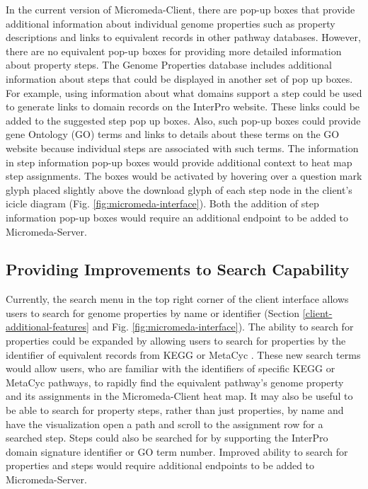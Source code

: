 In the current version of Micromeda-Client, there are pop-up boxes that provide additional information about individual genome properties such as property descriptions and links to equivalent records in other pathway databases. However, there are no equivalent pop-up boxes for providing more detailed information about property steps. The Genome Properties database includes additional information about steps that could be displayed in another set of pop up boxes. For example, using information about what domains support a step could be used to generate links to domain records on the InterPro website. These links could be added to the suggested step pop up boxes. Also, such pop-up boxes could provide gene Ontology (GO) terms and links to details about these terms on the GO website because individual steps are associated with such terms. The information in step information pop-up boxes would provide additional context to heat map step assignments. The boxes would be activated by hovering over a question mark glyph placed slightly above the download glyph of each step node in the client's icicle diagram (Fig. \ref{fig:micromeda-interface}). Both the addition of step information pop-up boxes would require an additional endpoint to be added to Micromeda-Server.

\subsection{Providing Improvements to Search Capability}

Currently, the search menu in the top right corner of the client interface allows users to search for genome properties by name or identifier (Section \ref{client-additional-features} and Fig. \ref{fig:micromeda-interface}). The ability to search for properties could be expanded by allowing users to search for properties by the identifier of equivalent records from KEGG \cite{kanehisa2000kegg} or MetaCyc \cite{karp2002metacyc}. These new search terms would allow users, who are familiar with the identifiers of specific KEGG or MetaCyc pathways, to rapidly find the equivalent pathway's genome property and its assignments in the Micromeda-Client heat map. It may also be useful to be able to search for property steps, rather than just properties, by name and have the visualization open a path and scroll to the assignment row for a searched step. Steps could also be searched for by supporting the InterPro domain signature identifier or GO term number. Improved ability to search for properties and steps would require additional endpoints to be added to Micromeda-Server.

